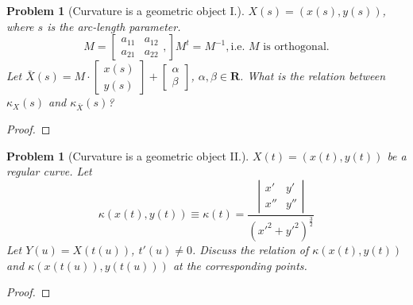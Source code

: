 \documentclass[12pt,a4paper]{article}
\newcounter{theProblemCounter}
\newtheorem{problem}[theProblemCounter]{Problem}
\begin{document}
\begin{problem}[Curvature is a geometric object I.]
$X(s)=(x(s), y(s))$, where $s$ is the arc-length parameter.
\[ M = \left[
\begin{array}{cc} a_{11} & a_{12} \\ a_{21} & a_{22} \end{array},
\right]
M^t = M^{-1}, \mbox{i.e. $M$ is orthogonal.}
\]
Let $\bar{X}(s) = M\cdot \left[\begin{array}{c} x(s)\\y(s)\end{array}\right] + \left[\begin{array}{c}\alpha \\ \beta\end{array}\right]$,  $\alpha, \beta\in \mathbf{R}$. What is the relation between $\kappa_X(s)$ and $\kappa_{\bar{X}}(s)$?
\end{problem}
\begin{proof}
\end{proof}

\begin{problem}[Curvature is a geometric object II.]
$X(t) = (x(t), y(t))$ be a regular curve. Let
\[ \kappa(x(t), y(t)) \equiv \kappa(t) = \frac{
\left|
\begin{array}{cc} x' & y' \\ x'' & y'' \end{array}
\right|
}{(x'^2+y'^2)^\frac32} \]
Let $Y(u) = X(t(u))$, $t'(u)\ne 0$. Discuss the relation of $\kappa(x(t), y(t))$ and $\kappa(x(t(u)), y(t(u)))$ at the corresponding points.
\end{problem}
\begin{proof}
\end{proof}
\end{document}
